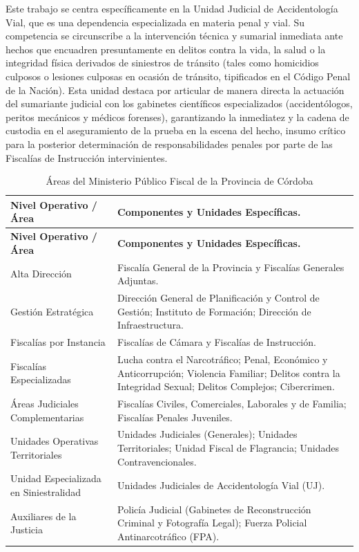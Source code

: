 Este trabajo se centra específicamente en la Unidad Judicial de Accidentología Vial, que es una dependencia especializada en materia penal y vial. Su competencia se circunscribe a la intervención técnica y sumarial inmediata ante hechos que encuadren presuntamente en delitos contra la vida, la salud o la integridad física derivados de siniestros de tránsito (tales como homicidios culposos o lesiones culposas en ocasión de tránsito, tipificados en el Código Penal de la Nación). Esta unidad destaca por articular de manera directa la actuación del sumariante judicial con los gabinetes científicos especializados (accidentólogos, peritos mecánicos y médicos forenses), garantizando la inmediatez y la cadena de custodia en el aseguramiento de la prueba en la escena del hecho, insumo crítico para la posterior determinación de responsabilidades penales por parte de las Fiscalías de Instrucción intervinientes.

\iffalse
\begin{longtable}[]{@{}
>{\centering\arraybackslash}p{}
  >{\centering\arraybackslash}p{}@{}}
\caption{Áreas del Ministerio Público Fiscal de la Provincia de Córdoba}
\label{tab:areas-del-ministerio-publico-fiscal-de-l}\\
\toprule\noalign{}
\textbf{Nivel Operativo / Área} & \textbf{Componentes y Unidades Específicas.} \\
\midrule\noalign{}
\endfirsthead
\toprule\noalign{}
\textbf{Nivel Operativo / Área} & \textbf{Componentes y Unidades Específicas.} \\
\midrule\noalign{}
\endhead
\bottomrule\noalign{}
\endlastfoot
Alta Dirección & Fiscalía General de la Provincia y Fiscalías Generales Adjuntas. \\
Gestión Estratégica & Dirección General de Planificación y Control de Gestión; Instituto de Formación; Dirección de Infraestructura. \\
Fiscalías por Instancia & Fiscalías de Cámara y Fiscalías de Instrucción. \\
Fiscalías Especializadas & Lucha contra el Narcotráfico; Penal, Económico y Anticorrupción; Violencia Familiar; Delitos contra la Integridad Sexual; Delitos Complejos; Cibercrimen. \\
Áreas Judiciales Complementarias & Fiscalías Civiles, Comerciales, Laborales y de Familia; Fiscalías Penales Juveniles. \\
Unidades Operativas Territoriales & Unidades Judiciales (Generales); Unidades Territoriales; Unidad Fiscal de Flagrancia; Unidades Contravencionales. \\
Unidad Especializada en Siniestralidad & Unidades Judiciales de Accidentología Vial (UJ). \\
Auxiliares de la Justicia & Policía Judicial (Gabinetes de Reconstrucción Criminal y Fotografía Legal); Fuerza Policial Antinarcotráfico (FPA). \\
\end{longtable}

